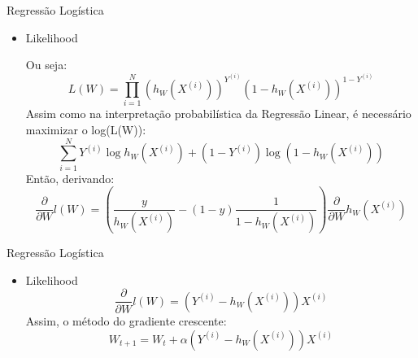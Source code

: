 \documentclass{beamer}
\begin{document}
  \begin{frame}{Regressão Logística}
  \begin{itemize}
  \item Likelihood
	
    Ou seja:
    \begin{equation}
    L(W) = \prod_{i = 1}^N (h_W(X^{(i)}))^{Y^{(i)}}(1 - h_W(X^{(i)}))^{1-Y^{(i)}}
    \end{equation}
    Assim como na interpretação probabilística da Regressão Linear, é necessário maximizar o log(L(W)):
    \begin{equation}
   \sum_{i=1}^N Y^{(i)} \log h_W(X^{(i)}) + (1 - Y^{(i)}) \log( 1 - h_W(X^{(i)}))
    \end{equation}
    Então, derivando:
    \begin{equation}
    \frac{\partial }{\partial W} l(W) = \left( \frac{y}{h_W(X^{(i)})} - (1 - y)\frac{1}{1 - h_W(X^{(i)})}\right) \frac{\partial}{\partial W} h_W(X^{(i)})
    \end{equation}    
  \end{itemize}
  \end{frame}
  
  \begin{frame}{Regressão Logística}
  \begin{itemize}
  \item Likelihood
  \begin{equation}
  \frac{\partial }{\partial W} l(W) = (Y^{(i)} - h_W(X^{(i)})) X^{(i)}
  \end{equation}
  Assim, o método do gradiente crescente:
  \begin{equation}
  W_{t+1} = W_t + \alpha (Y^{(i)} - h_W(X^{(i)}))X^{(i)}
  \end{equation}
  \end{itemize}
  \end{frame}
  
\end{document}
